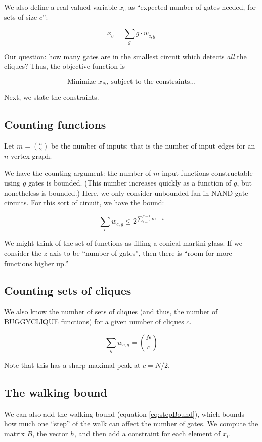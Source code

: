 \documentclass[12pt]{article}
\theoremstyle{definition}
\begin{document}
We also define a real-valued variable
$x_c$ as ``expected number of gates needed, for sets of size $c$'':

\[
x_c = \sum_g g \cdot w_{c,g}
\]

Our question: how many gates are in the smallest circuit
which detects {\em all} the cliques? Thus, the objective function
is

\[
\text{Minimize }x_N\text{, subject to the constraints...}
\]

Next, we state the constraints.

\subsection{Counting functions}

Let $m = {n \choose 2}$ be the number of inputs; that is the number
of input edges for an $n$-vertex graph.

We have the counting argument: the number of $m$-input functions
constructable using $g$ gates is bounded. (This number increases
quickly as a function of $g$, but nonetheless is bounded.)
Here, we only consider unbounded fan-in NAND gate circuits. For
this sort of circuit, we have the bound:

\[
\sum_c w_{c,g} \le 2^{\sum_{i=0}^{g-1} m+i}
\]

We might think of the set of functions as filling a conical
martini glass. If we consider the $z$ axis to be ``number of gates'',
then there is ``room for more functions higher up.''

\subsection{Counting sets of cliques}

We also know the number of sets of cliques (and thus, the number
of BUGGYCLIQUE functions) for a given number of cliques $c$.

\[
\sum_g w_{c,g} = {N \choose c}
\]

Note that this has a sharp maximal peak at $c = N/2$.

\subsection{The walking bound}

We can also add the walking bound (equation \ref{eq:stepBound}), which bounds how much
one ``step'' of the walk can affect the number of gates.
We compute the matrix $B$, the vector $h$, and then add a constraint for each element of $x_i$.
\end{document}

